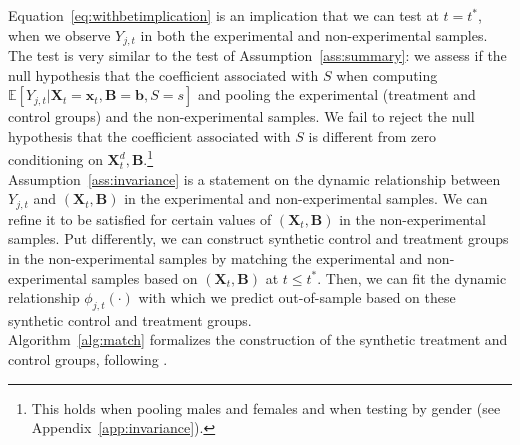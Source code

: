 \noindent Equation~\eqref{eq:withbetimplication} is an implication that we can test at $t = t^*$, when we observe $Y_{j,t}$ in both the experimental and non-experimental samples. The test is very similar to the test of Assumption~\ref{ass:summary}: we assess if the null hypothesis that the coefficient associated with $S$ when computing $\mathbb{E} \left[ Y_{j,t} | \bm{X}_{t}  = \bm{x}_{t}, \bm{B} =  \bm{b}, S = s \right]$ and pooling the experimental (treatment and control groups) and the non-experimental samples. We fail to reject the null  hypothesis that the coefficient associated with $S$ is different from zero conditioning on $\bm{X}_{t}^d, \bm{B}$.\footnote{This holds when pooling males and females and when testing by gender (see Appendix~\ref{app:invariance}).}\\

\noindent Assumption~\ref{ass:invariance} is a statement on the dynamic relationship between $Y_{j,t}$ and $\left( \bm{X}_{t}, \bm{B} \right)$ in the experimental and non-experimental samples. We can refine it to be satisfied for certain values of $\left( \bm{X}_{t}, \bm{B} \right)$ in the non-experimental samples. Put differently, we can construct synthetic control and treatment groups in the non-experimental samples by matching the experimental and non-experimental samples based on $\left( \bm{X}_{t}, \bm{B} \right)$ at $t \leq t^*$. Then, we can fit the dynamic relationship $\phi_{j,t} \left( \cdot \right)$ with which we predict out-of-sample based on these synthetic control and treatment groups.\\

\noindent Algorithm~\ref{alg:match} formalizes the construction of the synthetic treatment and control groups, following \citet{Heckman_Ichimura_etal_1998_REStud}.

